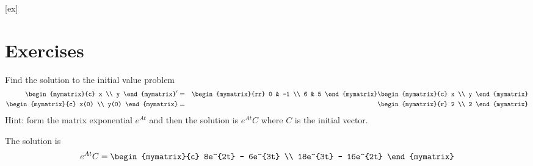 [ex]
\section*{Exercises}

\begin{enumialphparenastyle}

\begin{ex}
Find the solution to the initial value problem 
\begin{eqnarray*}
\begin{mymatrix}{c}
x \\ 
y 
\end{mymatrix} ^{\prime } &=&\begin{mymatrix}{rr}
0 & -1 \\ 
6 & 5 
\end{mymatrix} \begin{mymatrix}{c}
x \\ 
y 
\end{mymatrix} \\
\begin{mymatrix}{c}
x(0) \\ 
y(0) 
\end{mymatrix} &=&\begin{mymatrix}{r}
2 \\ 
2 
\end{mymatrix}
\end{eqnarray*} 
Hint: form the matrix exponential $e^{At}$ and then the solution is $e^{At}C$ where $C$ is the initial vector. 
\begin{sol}
The solution is 
\[
e^{At}C = \begin{mymatrix}{c}
8e^{2t} - 6e^{3t} \\
18e^{3t} - 16e^{2t}
\end{mymatrix}
\]
\end{sol}
\end{ex}



\end{enumialphparenastyle}
